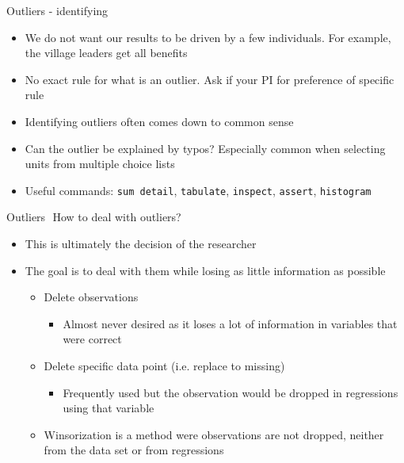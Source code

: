 \documentclass[aspectratio=169]{beamer}
\begin{document}
\begin{frame}{Outliers - identifying}
\begin{itemize}
	\item We do not want our results to be driven by a few individuals. For example, the village leaders get all benefits
	\item No exact rule for what is an outlier.  Ask if your PI for preference of specific rule
	\item Identifying outliers often comes down to common sense
	\item Can the outlier be explained by typos? Especially common when selecting units from multiple choice lists
	\item Useful commands: \texttt{sum detail}, \texttt{tabulate}, \texttt{inspect}, \texttt{assert}, \texttt{histogram}

\end{itemize}
\end{frame}


\begin{frame}{Outliers \newline How to deal with outliers?}
	\begin{itemize}
		\item This is ultimately the decision of the researcher
		\item The goal is to deal with them while losing as little information as possible
		\begin{itemize}
			\item Delete observations
			\begin{itemize}
				\item Almost never desired as it loses a lot of information in variables that were correct
			\end{itemize}
			\item Delete specific data point (i.e. replace to missing)
			\begin{itemize}
				\item Frequently used but the observation would be dropped in regressions using that variable
			\end{itemize}
			\item Winsorization is a method were observations are not dropped, neither from the data set or from regressions
		\end{itemize}
	\end{itemize}
\end{frame}
\end{document}

